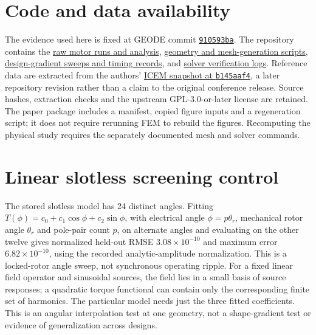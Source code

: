 \documentclass{anvil-paper}
\begin{document}
\section*{Code and data availability}
The evidence used here is fixed at GEODE commit
\href{https://github.com/rjwalters/geode-fem/tree/910593bad6f64f9f01671c2632b57034e72b9c61}{\texttt{910593ba}}.
The repository contains the
\href{https://github.com/rjwalters/geode-fem/tree/910593bad6f64f9f01671c2632b57034e72b9c61/benchmarks/motor_reference/forward_harmonic}{raw motor runs and analysis},
\href{https://github.com/rjwalters/geode-fem/tree/910593bad6f64f9f01671c2632b57034e72b9c61/benchmarks/motor_reference/geometry}{geometry and mesh-generation scripts},
\href{https://github.com/rjwalters/geode-fem/tree/910593bad6f64f9f01671c2632b57034e72b9c61/benchmarks/motor_shape_gradient/design}{design-gradient sweeps and timing records},
and \href{https://github.com/rjwalters/geode-fem/tree/910593bad6f64f9f01671c2632b57034e72b9c61/benchmarks/motor_nonlinear_m1}{solver verification logs}.
Reference data are extracted from the authors'
\href{https://github.com/MichaelWiesheu/ICEMsnapshot/tree/b145aaf4ab1a6424828bc941eaf172f48fa0d458}{ICEM snapshot at \texttt{b145aaf4}},
a later repository revision rather than a claim to the original conference
release. Source hashes, extraction checks and the upstream GPL-3.0-or-later license
are retained. The paper package includes a manifest, copied figure inputs
and a regeneration script; it does not require rerunning FEM to rebuild
the figures. Recomputing the physical study requires the separately
documented mesh and solver commands.

\appendix
\section{Linear slotless screening control}\label{sec:slotless}
The stored slotless model has 24 distinct angles. Fitting
$T(\phi)=c_0+c_1\cos\phi+c_2\sin\phi$, with electrical angle $\phi=p\theta_r$, mechanical rotor angle $\theta_r$
and pole-pair count $p$, on alternate angles and
evaluating on the other twelve gives normalized held-out RMSE
$3.08\times10^{-10}$ and maximum error $6.82\times10^{-10}$, using the
recorded analytic-amplitude normalization. This is a locked-rotor angle sweep,
not synchronous operating ripple. For a fixed linear field operator and
sinusoidal sources, the field lies in a small basis of source responses;
a quadratic torque functional can contain only the corresponding finite
set of harmonics. The particular model needs just the three fitted
coefficients. This is an angular interpolation test at one geometry,
not a shape-gradient test or evidence of generalization across designs.
\end{document}
